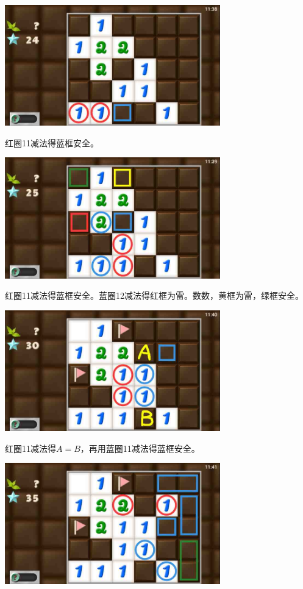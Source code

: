 \begin{center}
    \includegraphics[width=0.7\textwidth]{puzzlelow/224-3.jpg}
\end{center}
红圈11减法得蓝框安全。
\begin{center}
    \includegraphics[width=0.7\textwidth]{puzzlelow/224-4.jpg}
\end{center}
红圈11减法得蓝框安全。蓝圈12减法得红框为雷。数数，黄框为雷，绿框安全。
\begin{center}
    \includegraphics[width=0.7\textwidth]{puzzlelow/224-5.jpg}
\end{center}
红圈11减法得$A=B$，再用蓝圈11减法得蓝框安全。
\begin{center}
    \includegraphics[width=0.7\textwidth]{puzzlelow/224-6.jpg}
\end{center}
